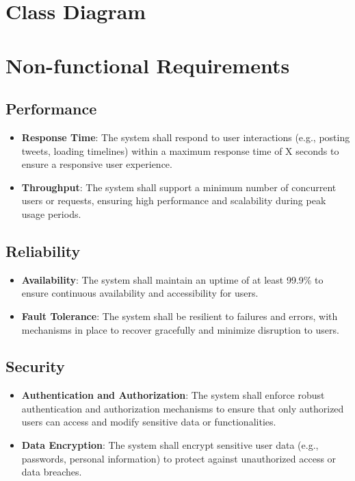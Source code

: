 \documentclass{article}
\begin{document}
\section{Class Diagram}

\section{Non-functional Requirements}
\subsection{Performance}
\begin{itemize}[label=$\bullet$]
    \item \textbf{Response Time}: The system shall respond to user interactions (e.g., posting tweets, loading timelines) within a maximum response time of X seconds to ensure a responsive user experience.
    \item \textbf{Throughput}: The system shall support a minimum number of concurrent users or requests, ensuring high performance and scalability during peak usage periods.
\end{itemize}

\subsection{Reliability}
\begin{itemize}[label=$\bullet$]
    \item \textbf{Availability}: The system shall maintain an uptime of at least 99.9\% to ensure continuous availability and accessibility for users.
    \item \textbf{Fault Tolerance}: The system shall be resilient to failures and errors, with mechanisms in place to recover gracefully and minimize disruption to users.
\end{itemize}

\subsection{Security}
\begin{itemize}[label=$\bullet$]
    \item \textbf{Authentication and Authorization}: The system shall enforce robust authentication and authorization mechanisms to ensure that only authorized users can access and modify sensitive data or functionalities.
    \item \textbf{Data Encryption}: The system shall encrypt sensitive user data (e.g., passwords, personal information) to protect against unauthorized access or data breaches.
\end{itemize}
\end{document}
